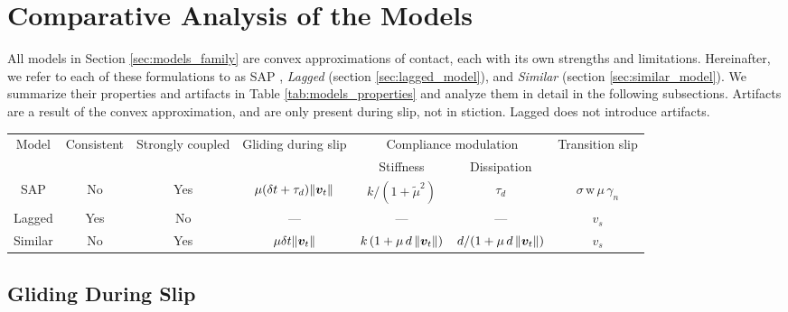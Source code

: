 \section{Comparative Analysis of the Models}
\label{sec:comparative_analysis}

All models in Section \ref{sec:models_family} are convex approximations of
contact, each with its own strengths and limitations. Hereinafter, we refer to
each of these formulations to as SAP \cite{bib:castro2022unconstrained},
\emph{Lagged} (section \ref{sec:lagged_model}), and \emph{Similar} (section
\ref{sec:similar_model}). We summarize their properties and artifacts in Table
\ref{tab:models_properties} and analyze them in detail in the following
subsections. Artifacts are a result of the convex approximation, and are only
present during slip, not in stiction.  Lagged does not introduce artifacts.

\begin{table*}[h]
    \centering
    \begin{tabular}{c|c|c|c|cc|c}
                                     Model & Consistent  & Strongly coupled &
                                     Gliding during slip   & \multicolumn{2}{|c|}{Compliance
                                     modulation} & Transition slip \\
                                     & & & & Stiffness & Dissipation \\
        \hline
        SAP           & No  & Yes & $\mu(\delta t + \tau_d)\Vert{\bm{v}}_t\Vert$ &
        $k/(1+\tilde{\mu}^2)$ &$\tau_d$ & $\sigma\,\text{w}\,\mu\,\gamma_n$\\
        Lagged        & Yes & No  &  ---                                       &
        --- & --- & $v_s$ \\
        Similar       & No  & Yes & $\mu\delta t\Vert{\bm{v}}_t\Vert$            &
        $k\,(1+\mu\,d\,\Vert{\bm{v}}_t\Vert)$ & $d/(1+\mu\,d\,\Vert{\bm{v}}_t\Vert)$
        & $v_s$ \\
    \end{tabular}
    \caption{Properties of each convex approximation in Section \ref{sec:models_family}.}
    \label{tab:models_properties}
\end{table*}

\subsection{Gliding During Slip}
\label{sec:gliding_artifact}


